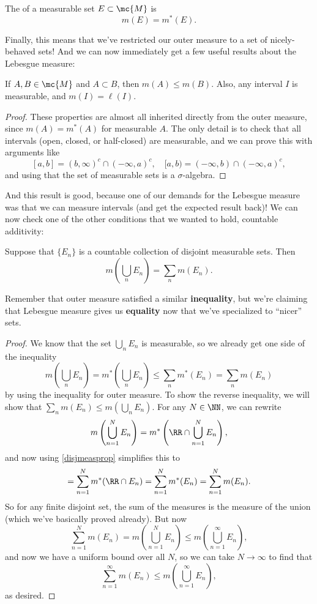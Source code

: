 \begin{definition}
The  of a measurable set $E \subset \mc{M}$ is
\[
    m(E) = m^\ast(E).
\]
\end{definition}

Finally, this means that we've restricted our outer measure to a set of nicely-behaved sets! And we can now immediately get a few useful results about the Lebesgue measure:

\begin{proposition}
If $A, B \in \mc{M}$ and $A \subset B$, then $m(A) \le m(B)$. Also, any interval $I$ is measurable, and $m(I) = \ell(I)$.
\end{proposition}
\begin{proof}
These properties are almost all inherited directly from the outer measure, since $m(A) = m^\ast(A)$ for measurable $A$. The only detail is to check that all intervals (open, closed, or half-closed) are measurable, and we can prove this with arguments like
\[
    [a, b] = (b, \infty)^c \cap (-\infty, a)^c, \quad [a, b) = (-\infty, b) \cap (-\infty, a)^c,
\]
and using that the set of measurable sets is a $\sigma$-algebra. 
\end{proof}

And this result is good, because one of our demands for the Lebesgue measure was that we can measure intervals (and get the expected result back)! We can now check one of the other conditions that we wanted to hold, countable additivity:

\begin{theorem}
Suppose that $\{E_n\}$ is a countable collection of disjoint measurable sets. Then 
\[
    m\left(\bigcup_n E_n\right) = \sum_n m(E_n).
\]
\end{theorem}

Remember that outer measure satisfied a similar \textbf{inequality}, but we're claiming that Lebesgue measure gives us \textbf{equality} now that we've specialized to ``nicer'' sets.

\begin{proof}
We know that the set $\bigcup_n E_n$ is measurable, so we already get one side of the inequality
\[
    m\left(\bigcup_n E_n\right) = m^\ast\left(\bigcup_n E_n\right) \le \sum_n m^\ast(E_n) = \sum_n m(E_n)
\]
by using the inequality for outer measure. To show the reverse inequality, we will show that $\sum_n m(E_n) \le m\left(\bigcup_n E_n\right)$. For any $N \in \NN$, we can rewrite
\[
    m\left(\bigcup_{n=1}^N E_n\right) = m^\ast \left(\RR \cap \bigcup_{n=1}^N E_n\right),
\]
and now using \cref{disjmeasprop} simplifies this to 
\[
    = \sum_{n=1}^N m^\ast( \RR \cap E_n) = \sum_{n=1}^N m^\ast(E_n) = \sum_{n=1}^N m(E_n). 
\]
So for any finite disjoint set, the sum of the measures is the measure of the union (which we've basically proved already). But now 
\[
    \sum_{n=1}^{N} m(E_n) = m \left(\bigcup_{n=1}^N E_n\right) \le m \left(\bigcup_{n=1}^\infty E_n\right),
\]
and now we have a uniform bound over all $N$, so we can take $N \to \infty$ to find that 
\[
    \sum_{n=1}^{\infty} m(E_n) \le m\left(\bigcup_{n=1}^{\infty} E_n\right),
\]
as desired. 
\end{proof}

